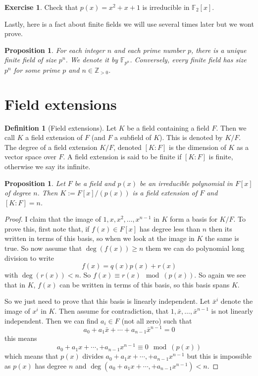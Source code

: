 \documentclass[11pt,a4paper]{report}
\theoremstyle{plain}
\newtheorem{prop}[subsection]{Proposition}
\theoremstyle{definition}
\newtheorem{defn}[subsection]{Definition}
\theoremstyle{definition}
\newtheorem{question}[subsection]{Exercise}
\newcommand{\ZZ}{\mathbb{Z}}
\def\FF{\mathbb{F}}
\begin{document}
	\begin{question}\label{ques: irr pol mod 2}
		Check that $p(x)=x^2+x+1$  is irreducible in $\FF_2[x]$.
	\end{question}
	
	Lastly, here is a fact about finite fields we will use several times later but we wont prove.
	
	\begin{prop}
		For each integer $n$ and each prime number $p$, there is a unique finite field of size $p^n$. We denote it by $\FF_{p^n}$. Conversely, every finite field has size $p^n$ for some prime $p$ and $n \in \ZZ_{> 0}$.
	\end{prop}
	
	\section{Field extensions}
	
	\begin{defn}[Field extensions]
		Let $K$ be a field containing a field $F$. Then we call $K$ a field extension of $F$ (and $F$ a subfield of $K$). This is denoted by $K/F$. The degree of a field extension $K/F$, denoted $[K:F]$ is the dimension of $K$ as a vector space over $F$. A field extension is said to be finite if $[K:F]$ is finite, otherwise we say its infinite.
	\end{defn}	
	
	
	\begin{prop}\label{prop: dim of field ext}
		Let $F$ be a field and $p(x)$ be an irreducible polynomial in $F[x]$ of degree $n$. Then $K:=F[x]/(p(x))$ is a field extension of $F$ and $[K:F]=n$.
	\end{prop}	
	\begin{proof}
		I claim that the image of $1,x,x^2,\dots,x^{n-1}$ in $K$ form a basis for $K/F$. To prove this, first note that, if $f(x) \in F[x]$ has degree less than $n$ then its written in terms of this basis, so when we look at the image in $K$ the same is true. So now assume that $\deg(f(x))\geq n$ them we can do polynomial long division to write \[f(x)=q(x)p(x)+r(x)\] with $\deg(r(x)) < n$. So $f(x) \equiv r(x) \mod (p(x))$. So again we see that in $K$, $f(x)$ can be written in terms of this basis, so this basis spans $K$. 
		
		So we just need to prove that this basis is linearly independent. Let $\bar{x}^i$ denote the image of $x^i$ in $K$. Then assume for contradiction, that $1,\bar x, \dots,\bar{x}^{n-1}$ is not linearly independent. Then we can find $a_i \in F$ (not all zero) such that \[a_0+a_1\bar{x}+\cdots+a_{n-1}\bar{x}^{n-1}=0\] this means \[a_0+a_1 x+\cdots,+a_{n-1}x^{n-1} \equiv 0 \mod (p(x))\] which means that $p(x)$ divides $a_0+a_1 x+\cdots,+a_{n-1}x^{n-1} $ but this is impossible as  $p(x)$ has degree $n$ and  $\deg( a_0+a_1 x+\cdots,+a_{n-1}x^{n-1} )<n$.   
	\end{proof}
	
\end{document}
